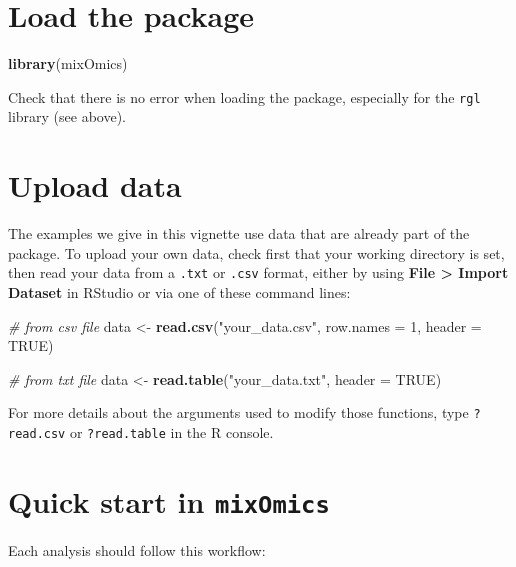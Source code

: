 \documentclass[]{book}
\newenvironment{Shaded}{\begin{snugshade}}{\end{snugshade}}
\newcommand{\KeywordTok}[1]{\textcolor[rgb]{0.13,0.29,0.53}{\textbf{#1}}}
\newcommand{\DataTypeTok}[1]{\textcolor[rgb]{0.13,0.29,0.53}{#1}}
\newcommand{\DecValTok}[1]{\textcolor[rgb]{0.00,0.00,0.81}{#1}}
\newcommand{\StringTok}[1]{\textcolor[rgb]{0.31,0.60,0.02}{#1}}
\newcommand{\CommentTok}[1]{\textcolor[rgb]{0.56,0.35,0.01}{\textit{#1}}}
\newcommand{\OtherTok}[1]{\textcolor[rgb]{0.56,0.35,0.01}{#1}}
\newcommand{\NormalTok}[1]{#1}
\theoremstyle{definition}
\theoremstyle{definition}
\theoremstyle{definition}
\theoremstyle{remark}
\begin{document}
\section{Load the package}\label{start:upload}

\begin{Shaded}
\begin{Highlighting}[]
\KeywordTok{library}\NormalTok{(mixOmics)}
\end{Highlighting}
\end{Shaded}

Check that there is no error when loading the package, especially for
the \texttt{rgl} library (see above).

\section{Upload data}\label{upload-data}

The examples we give in this vignette use data that are already part of
the package. To upload your own data, check first that your working
directory is set, then read your data from a \texttt{.txt} or
\texttt{.csv} format, either by using \textbf{File \textgreater{} Import
Dataset} in RStudio or via one of these command lines:

\begin{Shaded}
\begin{Highlighting}[]
\CommentTok{# from csv file}
\NormalTok{data <-}\StringTok{ }\KeywordTok{read.csv}\NormalTok{(}\StringTok{"your_data.csv"}\NormalTok{, }\DataTypeTok{row.names =} \DecValTok{1}\NormalTok{, }\DataTypeTok{header =} \OtherTok{TRUE}\NormalTok{)}

\CommentTok{# from txt file}
\NormalTok{data <-}\StringTok{ }\KeywordTok{read.table}\NormalTok{(}\StringTok{"your_data.txt"}\NormalTok{, }\DataTypeTok{header =} \OtherTok{TRUE}\NormalTok{)}
\end{Highlighting}
\end{Shaded}

For more details about the arguments used to modify those functions,
type \texttt{?read.csv} or \texttt{?read.table} in the R console.

\section{\texorpdfstring{Quick start in
\texttt{mixOmics}}{Quick start in mixOmics}}\label{start:PCA}

Each analysis should follow this workflow:
\end{document}

